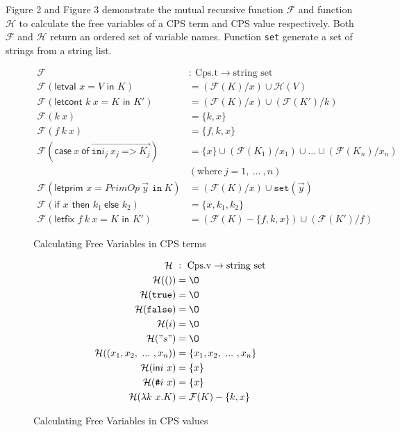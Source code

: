 \documentclass{article}
\theoremstyle{definition}
\theoremstyle{remark}
\numberwithin{equation}{section}
\begin{document}
Figure 2 and Figure 3 demonstrate the mutual recursive function $\mathcal{F}$ and
function $\mathcal{H}$ to calculate the free variables of a CPS term and CPS value
respectively. Both $\mathcal{F}$ and $\mathcal{H}$ return an ordered set of
 variable names. Function \texttt{set} generate a set of strings from a string list.\\

\begin{figure}[!ht]
  \centering
\begin{align*}
\mathcal{F}\ &:\ \textrm{Cps.t} \to \textrm{string set}\\     %
\mathcal{F}(\textsf{letval }x=V\textsf{ in }K)
    &=(\mathcal{F}(K)/x)\cup \mathcal{H}(V)\\   %
\mathcal{F}(\textsf{letcont }k\ x=K\textsf{ in }K')
    &=(\mathcal{F}(K)/x)\cup (\mathcal{F}(K')/k)\\   %
\mathcal{F}(k\ x)
    &=\{k, x\}\\   %
\mathcal{F}(f\ k\ x)
    &=\{f, k, x\}\\   %
\mathcal{F}(\textsf{case}\ x\ \textsf{of}
            \ \overrightarrow{\texttt{in}i_j\ x_j\ \texttt{=>}\ K_j})
    &=\{x\}\cup (\mathcal{F}(K_1)/x_1)\cup ... \cup (\mathcal{F}(K_n)/x_n)\\
        & (\textrm{where}\ j = 1,\ ...\ , n)\\   %
\mathcal{F}(\textsf{letprim }x=PrimOp\ \vec{y}\texttt{ in}\ K)
    &=(\mathcal{F}(K)/x)\cup \texttt{set}(\vec{y})\\   %
\mathcal{F}(\textsf{if }x\textsf{ then }k_1\ \textsf{else }k_2)
    &=\{x, k_1, k_2\}\\   %
\mathcal{F}(\textsf{letfix }f\ k\ x=K\textsf{ in }K')
    &=(\mathcal{F}(K)-\{f,k,x\})\cup (\mathcal{F}(K')/f)   %
\end{align*}
  \caption{Calculating Free Variables in CPS terms}
  \label{fig-sub}
\end{figure}

\begin{figure}[!ht]
  \centering
\begin{align*}
\mathcal{H}\ &:\ \textrm{Cps.v} \to \textrm{string set}\\     %
\mathcal{H}(()) &={\O}\\   %
\mathcal{H}(\texttt{true}) &={\O}\\   %
\mathcal{H}(\texttt{false}) &={\O}\\   %
\mathcal{H}(i) &={\O}\\   %
\mathcal{H}("s") &={\O}\\   %
\mathcal{H}((x_1, x_2,\ ...\ , x_n)) &=\{x_1, x_2,\ ...\ , x_n\}\\   %
\mathcal{H}(\textsf{in}i\ x) &= \{x\}\\        %
\mathcal{H}(\texttt{\#}i\ x) &= \{x\}\\        %
\mathcal{H}(\lambda k\ x.K) &= \mathcal{F}(K)-\{k, x\}      %
\end{align*}
  \caption{Calculating Free Variables in CPS values}
  \label{fig-sub}
\end{figure}
\end{document}
